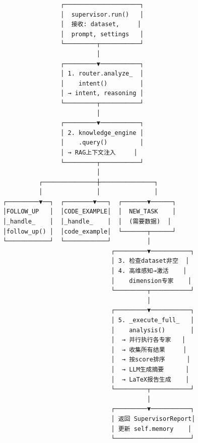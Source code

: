 \documentclass[11pt,a4paper]{ctexbook}
\begin{document}
\begin{tcolorbox}[title={\textbf{流程图：ACESupervisor.run() 控制流}}, enhanced, breakable, colback=white]
{\small
\begin{verbatim}
                    ┌─────────────────────┐
                    │  supervisor.run()   │
                    │  接收: dataset,     │
                    │  prompt, settings   │
                    └─────────┬───────────┘
                              │
                    ┌─────────▼───────────┐
                    │ 1. router.analyze_  │
                    │    intent()         │
                    │ → intent, reasoning │
                    └─────────┬───────────┘
                              │
                    ┌─────────▼───────────┐
                    │ 2. knowledge_engine │
                    │    .query()         │
                    │ → RAG上下文注入     │
                    └─────────┬───────────┘
                              │
              ┌───────────────┼───────────────┐
              │               │               │
    ┌─────────▼──┐  ┌────────▼───┐  ┌───────▼──────┐
    │FOLLOW_UP   │  │CODE_EXAMPLE│  │  NEW_TASK    │
    │_handle_    │  │_handle_    │  │  (需要数据)  │
    │follow_up() │  │code_example│  └───────┬──────┘
    └────────────┘  └────────────┘          │
                                  ┌─────────▼───────────┐
                                  │ 3. 检查dataset非空  │
                                  │ 4. 高维感知→激活    │
                                  │    dimension专家    │
                                  └─────────┬───────────┘
                                            │
                                  ┌─────────▼───────────┐
                                  │ 5. _execute_full_   │
                                  │    analysis()       │
                                  │  → 并行执行各专家   │
                                  │  → 收集所有结果     │
                                  │  → 按score排序      │
                                  │  → LLM生成摘要      │
                                  │  → LaTeX报告生成    │
                                  └─────────┬───────────┘
                                            │
                                  ┌─────────▼───────────┐
                                  │ 返回 SupervisorReport│
                                  │ 更新 self.memory    │
                                  └─────────────────────┘
\end{verbatim}
}
\end{tcolorbox}
\end{document}
